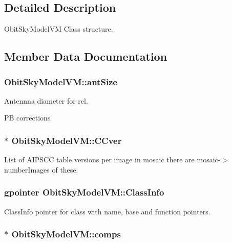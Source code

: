 \subsection{Detailed Description}
Obit\-Sky\-Model\-VM Class structure. 



\subsection{Member Data Documentation}
\subsubsection{ {\bf Obit\-Sky\-Model\-VM::ant\-Size}}\label{structObitSkyModelVM_o27}


Antennna diameter for rel. 

PB corrections 
\subsubsection{$\ast$ {\bf Obit\-Sky\-Model\-VM::CCver}}\label{structObitSkyModelVM_o17}


List of AIPSCC table versions per image in mosaic there are mosaic-$>$number\-Images of these. 

\subsubsection{\setlength{\rightskip}{0pt plus 5cm}gpointer {\bf Obit\-Sky\-Model\-VM::Class\-Info}}\label{structObitSkyModelVM_o1}


Class\-Info pointer for class with name, base and function pointers. 

\subsubsection{$\ast$ {\bf Obit\-Sky\-Model\-VM::comps}}\label{structObitSkyModelVM_o11}


